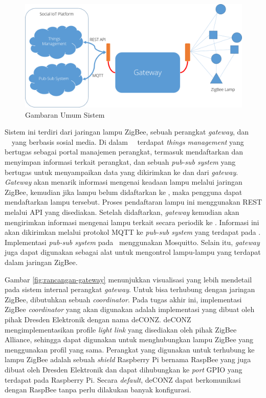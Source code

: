 \begin{figure}
	\centering
	\includegraphics[width=.9\textwidth]{pics/rancangan-sistem.PNG}
	\caption{Gambaran Umum Sistem}
	\label{fig:rancangan-sistem}
\end{figure}

Sistem ini terdiri dari jaringan lampu ZigBee, sebuah perangkat \textit{gateway}, dan \plat~\iot~yang berbasis sosial media. Di dalam \plat~\iot~terdapat \textit{things management} yang bertugas sebagai portal manajemen perangkat, termasuk mendaftarkan dan menyimpan informasi terkait perangkat, dan sebuah \textit{pub-sub system} yang bertugas untuk menyampaikan data yang dikirimkan ke dan dari \textit{gateway}. \textit{Gateway} akan menarik informasi mengenai keadaan lampu melalui jaringan ZigBee, kemudian jika lampu belum didaftarkan ke \plat, maka pengguna dapat mendaftarkan lampu tersebut. Proses pendaftaran lampu ini menggunakan REST melalui API yang disediakan. Setelah didaftarkan, \textit{gateway} kemudian akan mengirimkan informasi mengenai lampu terkait secara periodik ke \plat. Informasi ini akan dikirimkan melalui protokol MQTT ke \textit{pub-sub system} yang terdapat pada \plat. Implementasi \textit{pub-sub system} pada \plat~menggunakan Mosquitto. Selain itu, \textit{gateway} juga dapat digunakan sebagai alat untuk mengontrol lampu-lampu yang terdapat dalam jaringan ZigBee.

Gambar \ref{fig:rancangan-gateway} menunjukkan visualisasi yang lebih mendetail pada sistem internal perangkat \textit{gateway}. Untuk bisa terhubung dengan jaringan ZigBee, dibutuhkan sebuah \textit{coordinator}. Pada tugas akhir ini, implementasi ZigBee \textit{coordinator} yang akan digunakan adalah implementasi yang dibuat oleh pihak Dresden Elektronik dengan nama deCONZ. deCONZ mengimplementasikan profile \textit{light link} yang disediakan oleh pihak ZigBee Alliance, sehingga dapat digunakan untuk menghubungkan lampu ZigBee yang menggunakan profil yang sama. Perangkat yang digunakan untuk terhubung ke lampu ZigBee adalah sebuah \textit{shield} Raspberry Pi bernama RaspBee yang juga dibuat oleh Dresden Elektronik dan dapat dihubungkan ke \textit{port} GPIO yang terdapat pada Raspberry Pi. Secara \textit{default}, deCONZ dapat berkomunikasi dengan RaspBee tanpa perlu dilakukan banyak konfigurasi.

